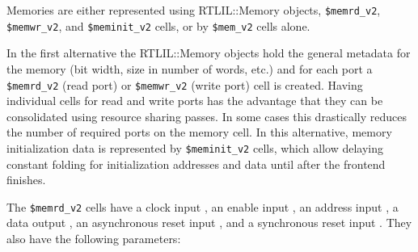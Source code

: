 Memories are either represented using RTLIL::Memory objects, {\tt \$memrd\_v2}, {\tt \$memwr\_v2}, and {\tt \$meminit\_v2}
cells, or by {\tt \$mem\_v2} cells alone.

In the first alternative the RTLIL::Memory objects hold the general metadata for the memory (bit width,
size in number of words, etc.) and for each port a {\tt \$memrd\_v2} (read port) or {\tt \$memwr\_v2} (write port)
cell is created. Having individual cells for read and write ports has the advantage that they can be
consolidated using resource sharing passes. In some cases this drastically reduces the number of required
ports on the memory cell. In this alternative, memory initialization data is represented by {\tt \$meminit\_v2} cells,
which allow delaying constant folding for initialization addresses and data until after the frontend finishes.

The {\tt \$memrd\_v2} cells have a clock input , an enable input , an
address input , a data output , an asynchronous reset input ,
and a synchronous reset input . They also have the following parameters:


